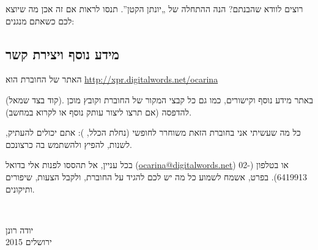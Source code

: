רוצים לוודא שהבנתם? הנה ההתחלה של „יונתן הקטן”. תנסו לראות אם זה אכן מה שיוצא לכם כשאתם מנגנים:

\begin{samepage}
	\begin{LTR}
		\takto{}{\g\e\e\z}{\x}
		\takto{}{\f\d\d\z}{\x}\par
		\takto{}{\c\d\e\f}{\x}
		\takto{}{\g\g\g\z}{\x}
	\end{LTR}
\end{samepage}



\subsection*{מידע נוסף ויצירת קשר}

האתר של החוברת הוא \url{http://xpr.digitalwords.net/ocarina}

(קוד  בצד שמאל). באתר מידע נוסף וקישורים, כמו גם כל קבצי המקור של החוברת וקובץ מוכן להדפסה (אם תרצו ליצור עותק נוסף או לקרוא במחשב).

כל מה שעשיתי אני בחוברת הזאת משוחרר לחופשי (נחלת הכלל, ): אתם יכולים להעתיק, לשנות, להפיץ ולהשתמש בה כרצונכם.

בכל עניין, אל תהססו לפנות אלי בדואל (\url{ocarina@digitalwords.net}) או בטלפון (02-6419913). בפרט, אשמח לשמוע כל מה יש לכם להגיד על החוברת, ולקבל הצעות, שיפורים ותיקונים.

\vspace{\baselineskip}
~\hfill
\begin{minipage}{3cm}
	יודה רונן\\
	ירושלים 2015\\
\end{minipage}

